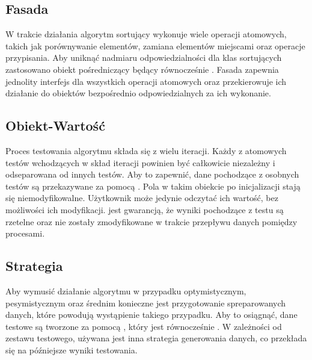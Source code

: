 \subsection{Fasada}
W trakcie działania algorytm sortujący wykonuje wiele operacji atomowych, takich jak porównywanie
elementów, zamiana elementów miejscami oraz operacje przypisania. Aby uniknąć nadmiaru odpowiedzialności
dla klas sortujących zastosowano obiekt pośredniczący  będący równocześnie .
Fasada zapewnia jednolity interfejs dla wszystkich operacji atomowych oraz przekierowuje ich działanie
do obiektów bezpośrednio odpowiedzialnych za ich wykonanie.

\begin{figure}[H]
	\centering
	
\end{figure}

\subsection{Obiekt-Wartość}
Proces testowania algorytmu składa się z wielu iteracji. Każdy z atomowych testów wchodzących w skład
iteracji powinien być całkowicie niezależny i odseparowana od innych testów. Aby to zapewnić, dane pochodzące
z osobnych testów są przekazywane za pomocą . Pola w takim obiekcie po
inicjalizacji stają się niemodyfikowalne. Użytkownik może jedynie odczytać ich wartość, bez możliwości ich modyfikacji.  jest gwarancją, że wyniki pochodzące z testu są rzetelne oraz nie zostały
zmodyfikowane w trakcie przepływu danych pomiędzy procesami.

\begin{figure}[H]
	\centering
	
\end{figure}

\subsection{Strategia}
Aby wymusić działanie algorytmu w przypadku optymistycznym, pesymistycznym oraz średnim konieczne jest przygotowanie
spreparowanych danych, które powodują wystąpienie takiego przypadku. Aby to osiągnąć, dane testowe są tworzone za pomocą , który jest równocześnie . W zależności od zestawu testowego, używana jest inna strategia generowania danych, co przekłada się na późniejsze wyniki testowania.

